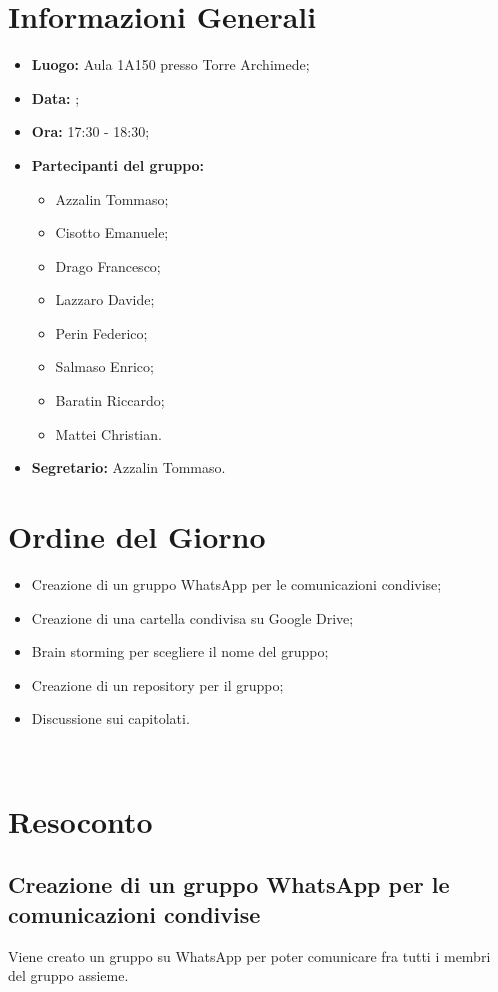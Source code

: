 \section{Informazioni Generali}
\begin{itemize}
\item \textbf{Luogo:} Aula 1A150 presso Torre Archimede;
\item \textbf{Data:} \Data;
\item \textbf{Ora:} 17:30 - 18:30;
\item \textbf{Partecipanti del gruppo:}
	\begin{itemize}
	\item Azzalin Tommaso; 
	\item Cisotto Emanuele; 
	\item Drago Francesco;
	\item Lazzaro Davide;
	\item Perin Federico;
	\item Salmaso Enrico;
	\item Baratin Riccardo;
	\item Mattei Christian.
	\end{itemize} 
\item \textbf{Segretario:} Azzalin Tommaso.
\end{itemize}

\clearpage

\section{Ordine del Giorno}
\begin{itemize}
	\item Creazione di un gruppo WhatsApp per le comunicazioni condivise; 
	\item Creazione di una cartella condivisa su Google Drive;
	\item Brain storming per scegliere il nome del gruppo;
	\item Creazione di un repository per il gruppo;
	\item Discussione sui capitolati.
\end{itemize}

~\\

\section{Resoconto}
\subsection{Creazione di un gruppo WhatsApp per le comunicazioni condivise}
Viene creato un gruppo su WhatsApp per poter comunicare fra tutti i membri del gruppo assieme.

